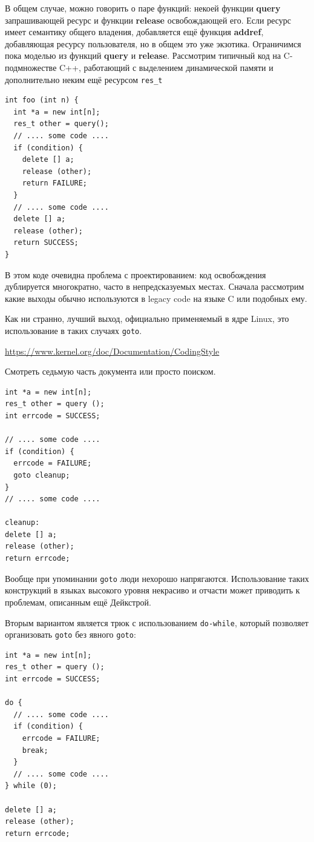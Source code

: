 \documentclass[a4paper,12pt,oneside]{book}
\begin{document}
В общем случае, можно говорить о паре функций: некоей функции \textbf{query} запрашивающей ресурс и функции \textbf{release} освобождающей его. Если ресурс имеет семантику общего владения, добавляется ещё функция \textbf{addref}, добавляющая ресурсу пользователя, но в общем это уже экзотика. Ограничимся пока моделью из функций \textbf{query} и \textbf{release}. Рассмотрим типичный код на C-подмножестве C++, работающий с выделением динамической памяти и дополнительно неким ещё ресурсом \lstinline!res_t!

\begin{lstlisting}
int foo (int n) {
  int *a = new int[n];
  res_t other = query();
  // .... some code ....
  if (condition) {
    delete [] a;
    release (other);
    return FAILURE;      
  }
  // .... some code ....
  delete [] a;
  release (other);
  return SUCCESS;
}
\end{lstlisting}

В этом коде очевидна проблема с проектированием: код освобождения дублируется многократно, часто в непредсказуемых местах. Сначала рассмотрим какие выходы обычно используются в legacy code на языке C или подобных ему.

Как ни странно, лучший выход, официально применяемый в ядре Linux, это использование в таких случаях \lstinline!goto!.

\url{https://www.kernel.org/doc/Documentation/CodingStyle}

Смотреть седьмую часть документа или просто поиском.

\begin{lstlisting}
int *a = new int[n];
res_t other = query ();
int errcode = SUCCESS;

// .... some code ....
if (condition) {
  errcode = FAILURE;
  goto cleanup;
}
// .... some code ....

cleanup:
delete [] a;
release (other);
return errcode;
\end{lstlisting}

Вообще при упоминании \lstinline!goto! люди нехорошо напрягаются. Использование таких конструкций в языках высокого уровня некрасиво и отчасти может приводить к проблемам, описанным ещё Дейкстрой.

Вторым вариантом является трюк с использованием \lstinline!do-while!, который позволяет организовать \lstinline!goto! без явного \lstinline!goto!:

\begin{lstlisting}
int *a = new int[n];
res_t other = query ();
int errcode = SUCCESS;

do {
  // .... some code ....
  if (condition) {
    errcode = FAILURE;
    break;
  }
  // .... some code ....
} while (0);

delete [] a;
release (other);
return errcode;
\end{lstlisting}
\end{document}
